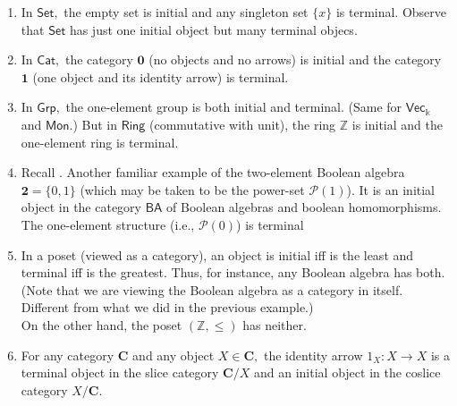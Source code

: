 \documentclass[11pt,leqno,landscape,semhelv]{seminar}
\numberwithin{equation}{section}
\theoremstyle{definition}
\numberwithin{thm}{section}
\numberwithin{equation}{section}
\begin{document}
\begin{enumerate}
	\item In $\mathsf{Set},$ the empty set is initial and any singleton set $\{x\}$ is terminal. Observe that $\mathsf{Set}$ has just one initial object but many terminal objecs.
	\item In $\mathsf{Cat},$ the category $\mathbf{0}$ (no objects and no arrows) is initial and the category $\mathbf{1}$ (one object and its identity arrow) is terminal.
	\item In $\mathsf{Grp},$ the one-element group is both initial and terminal. (Same for $\mathsf{Vec}_\Bbbk$ and $\mathsf{Mon}.$) But in $\mathsf{Ring}$ (commutative with unit), the ring $\mathbb{Z}$ is initial and the one-element ring is terminal.
	\item Recall .
	Another familiar example of the two-element Boolean algebra $\mathbf{2} = \{0, 1\}$ (which may be taken to be the power-set $\mathcal{P}(1)$). It is an initial object in the category $\mathsf{BA}$ of Boolean algebras and boolean homomorphisms.\\
	The one-element structure (i.e., $\mathcal{P}(0)$) is terminal
	\item In a poset (viewed as a category), an object is initial iff is the least and terminal iff is the greatest. Thus, for instance, any Boolean algebra has both. (Note that we are viewing the Boolean algebra as a category in itself. Different from what we did in the previous example.)\\
	On the other hand, the poset $(\mathbb{Z}, \le)$ has neither.
	\item For any category $\mathbf{C}$ and any object $X \in \mathbf{C},$ the identity arrow $1_X:X\to X$ is a terminal object in the slice category $\mathbf{C}/X$ and an initial object in the coslice category $X/\mathbf{C}.$

%
%

\end{enumerate}
\end{document}
